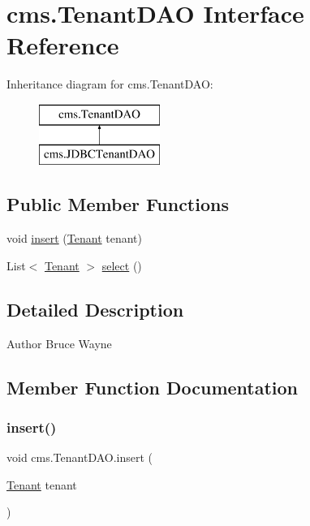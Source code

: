 \hypertarget{interfacecms_1_1_tenant_d_a_o}{}\section{cms.\+Tenant\+D\+AO Interface Reference}
\label{interfacecms_1_1_tenant_d_a_o}
Inheritance diagram for cms.\+Tenant\+D\+AO\+:\begin{figure}[H]
\begin{center}
\leavevmode
\includegraphics[height=2.000000cm]{interfacecms_1_1_tenant_d_a_o}
\end{center}
\end{figure}
\subsection*{Public Member Functions}
\begin{DoxyCompactItemize}
\item 
void \mbox{\hyperlink{interfacecms_1_1_tenant_d_a_o_a4c4f436ddf88bf487f1ab639ca383bb6}{insert}} (\mbox{\hyperlink{classcms_1_1_tenant}{Tenant}} tenant)
\item 
List$<$ \mbox{\hyperlink{classcms_1_1_tenant}{Tenant}} $>$ \mbox{\hyperlink{interfacecms_1_1_tenant_d_a_o_ab87faa632f84a2592f6f1b9bcb1ef2fe}{select}} ()
\end{DoxyCompactItemize}


\subsection{Detailed Description}
\begin{DoxyAuthor}{Author}
Bruce Wayne 
\end{DoxyAuthor}


\subsection{Member Function Documentation}
\mbox{\label{interfacecms_1_1_tenant_d_a_o_a4c4f436ddf88bf487f1ab639ca383bb6}} 
\subsubsection{\texorpdfstring{insert()}{insert()}}
{\footnotesize\ttfamily void cms.\+Tenant\+D\+A\+O.\+insert (\begin{DoxyParamCaption}\item[{\mbox{\hyperlink{classcms_1_1_tenant}{Tenant}}}]{tenant }\end{DoxyParamCaption})}



